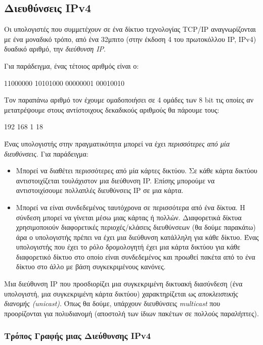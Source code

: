 %
%
\subsection{Διευθύνσεις IPv4}
Οι υπολογιστές που συμμετέχουν σε ένα δίκτυο τεχνολογίας TCP/IP αναγνωρίζονται με ένα μοναδικό τρόπο, από ένα 32μπιτο (στην έκδοση 4 του πρωτοκόλλου IP, IPv4) δυαδικό αριθμό, την \emph{διεύθυνση IP}.

Για παράδειγμα, ένας τέτοιος αριθμός είναι ο:

11000000 10101000 00000001 00010010

Τον παραπάνω αριθμό τον έχουμε ομαδοποιήσει σε 4 ομάδες των 8 bit τις οποίες αν μετατρέψουμε στους αντίστοιχους δεκαδικούς αριθμούς θα πάρουμε τους:

192 168 1 18

\begin{inthebox}
Ένας υπολογιστής στην πραγματικότητα μπορεί να έχει \emph{περισσότερες από μία διευθύνσεις}. Για παράδειγμα:

\begin{itemize}
\item Μπορεί να διαθέτει περισσότερες από μία κάρτες δικτύου. Σε κάθε κάρτα δικτύου αντιστοιχίζεται τουλάχιστον μια διεύθυνση IP. Επίσης μπορούμε να αντιστοιχίσουμε πολλαπλές διευθύνσεις IP σε μια κάρτα.
\item Μπορεί να είναι συνδεδεμένος ταυτόχρονα σε περισσότερα από ένα δίκτυα. Η σύνδεση μπορεί να γίνεται μέσω μιας κάρτας ή πολλών. Διαφορετικά δίκτυα χρησιμοποιούν διαφορετικές περιοχές/κλάσεις διευθύνσεων (θα δούμε παρακάτω) άρα ο υπολογιστής πρέπει να έχει μια διεύθυνση κατάλληλη για κάθε δίκτυο. Ένας υπολογιστής που έχει το ρόλο δρομολογητή έχει μια κάρτα δικτύου για κάθε διαφορετικό δίκτυο στο οποίο είναι συνδεδεμένος και προωθεί πακέτα από το ένα δίκτυο στο άλλο με βάση συγκεκριμένους κανόνες.
\end{itemize}

Μια διεύθυνση IP που προσδιορίζει μια συγκεκριμένη δικτυακή διασύνδεση (ένα υπολογιστή, μια συγκεκριμένη κάρτα δικτύου) χαρακτηρίζεται ως \emph{αποκλειστικής διανομής (unicast)}. Όπως θα δούμε, υπάρχουν διευθύνσεις \emph{multicast} που προορίζονται για πολυδιανομή (αποστολή των ίδιων πακέτων σε πολλούς παραλήπτες).\\
\end{inthebox}

\subsubsection*{Τρόπος Γραφής μιας Διεύθυνσης IPv4}

